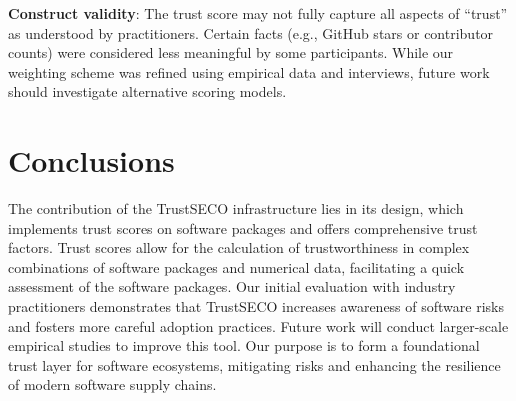 \documentclass[10pt,conference]{IEEEtran}
\begin{document}
\noindent\textbf{Construct validity}: The trust score may not fully capture all aspects of ``trust'' as understood by practitioners. Certain facts (e.g., GitHub stars or contributor counts) were considered less meaningful by some participants. While our weighting scheme was refined using empirical data and interviews, future work should investigate alternative scoring models.





\section{Conclusions}
\label{sec6:conclusion}

The contribution of the TrustSECO infrastructure lies in its design, which implements trust scores on software packages and offers comprehensive trust factors. Trust scores allow for the calculation of trustworthiness in complex combinations of software packages and numerical data, facilitating a quick assessment of the software packages. Our initial evaluation with industry practitioners demonstrates that TrustSECO increases awareness of software risks and fosters more careful adoption practices. Future work will conduct larger-scale empirical studies to improve this tool. Our purpose is to form a foundational trust layer for software ecosystems, mitigating risks and enhancing the resilience of modern software supply chains.









\end{document}
